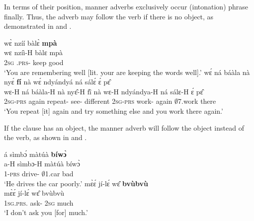 
\hspace*{-3.5pt}In terms of their position, manner adverbs exclusively occur (intonation) phrase finally. Thus, the adverb may follow the verb if there is no object, as demonstrated in  and .

\ea \label{Advmpa}
  \glll     wɛ̀ nzíí bàlɛ̀ {\bfseries mpà} \\
	wɛ nzíì-H bàlɛ mpà \\
              2\textsc{sg} {\PROG}.\textsc{prs}-{\R} keep good   \\
    \trans `You are remembering well [lit. your are keeping the words well].'
\ex\label{Advfi}
  \glll     wɛ́ ná báàla nà nyɛ́ {\bfseries fí} nà wɛ́ ndyándyá ná sálɛ́ ɛ́ pɛ̂  \\
	wɛ-H ná báàla-H nà nyɛ̂-H fī́ nà wɛ-H ndyándya-H ná sálɛ-H ɛ́ pɛ̂ \\
              2\textsc{sg}-\textsc{prs} again repeat-{\R} {\COM} see-{\R} different {\COM} 2\textsc{sg}-\textsc{prs} work-{\R} again $\emptyset$7.work {\LOC} there   \\
    \trans `You repeat [it] again and try something else and you work there again.'
\z

\noindent If the clause has an object, the manner adverb will follow the object instead of the verb, as shown in  and .

\ea \label{Advbiwo}
  \glll   á sìmbɔ́ màtúà {\bfseries bíwɔ̀}   \\
	a-H sìmbɔ-H màtúà bíwɔ̀ \\
              1-\textsc{prs} drive-{\R} $\emptyset$1.car bad   \\
    \trans `He drives the car poorly.'
\ex \label{Advbvu}
  \glll     mɛ̀ɛ́ jí-lɛ́ wɛ̂ {\bfseries bvùbvù} \\
	mɛ̀ɛ́ jí-lɛ́ wɛ̂ bvùbvù \\
              1\textsc{sg}.\textsc{prs}.{\NEG} ask-{\NEG} 2\textsc{sg} much   \\
    \trans `I don't ask you [for] much.'
\z


